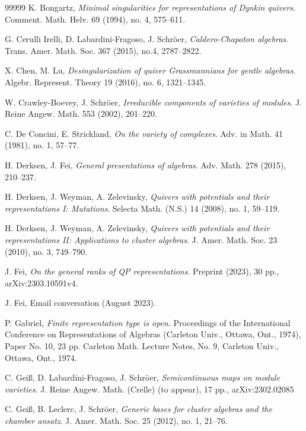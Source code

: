 \documentclass[12pt,reqno]{amsart}
\theoremstyle{definition}
\begin{document}
\begin{thebibliography}{99999}
K. Bongartz,
\emph{Minimal singularities for representations of Dynkin quivers}.
Comment. Math. Helv. 69 (1994), no. 4, 575--611.

G. Cerulli Irelli, D. Labardini-Fragoso,
J. Schr\"oer,
\emph{Caldero-Chapoton algebras}.
Trans. Amer. Math. Soc. 367 (2015), no.4, 2787--2822.


X. Chen, M. Lu,
\emph{Desingularization of quiver Grassmannians for gentle algebras}.
Algebr. Represent. Theory 19 (2016), no. 6, 1321--1345.

W. Crawley-Boevey, J. Schr\"oer,
\emph{Irreducible components of varieties of modules}.
J. Reine Angew. Math. 553 (2002), 201--220.

C. De Concini, E. Strickland,
\emph{On the variety of complexes}.
Adv. in Math. 41 (1981), no. 1, 57--77.


H. Derksen, J. Fei,
\emph{General presentations of algebras}.
Adv. Math. 278 (2015), 210--237.

H. Derksen, J. Weyman, A. Zelevinsky,
\emph{Quivers with potentials and their representations I:
Mutations}.
Selecta Math. (N.S.) 14 (2008), no. 1, 59--119.

H. Derksen, J. Weyman, A. Zelevinsky,
\emph{Quivers with potentials and their representations II:
Applications to cluster algebras}.
J. Amer. Math. Soc. 23 (2010), no. 3, 749--790.

J. Fei,
\emph{On the general ranks of QP representations}.
Preprint (2023), 30 pp., arXiv:2303.10591v4.

J. Fei, Email conversation (August 2023).

P. Gabriel,
\emph{Finite representation type is open}.
Proceedings of the International Conference on Representations of Algebras (Carleton Univ., Ottawa, Ont., 1974), Paper No. 10, 23 pp. Carleton Math. Lecture Notes, No. 9, Carleton Univ., Ottawa, Ont., 1974.

C. Gei{\ss}, D. Labardini-Fragoso, J. Schr\"oer,
\emph{Semicontinuous maps on module varieties}.
J. Reine Angew. Math. (Crelle) (to appear),
17 pp., arXiv:2302.02085

C. Gei{\ss}, B. Leclerc, J. Schr\"oer,
\emph{Generic bases for cluster algebras and the chamber ansatz}.
J. Amer. Math. Soc. 25 (2012), no. 1, 21--76.


\end{thebibliography}
\end{document}
